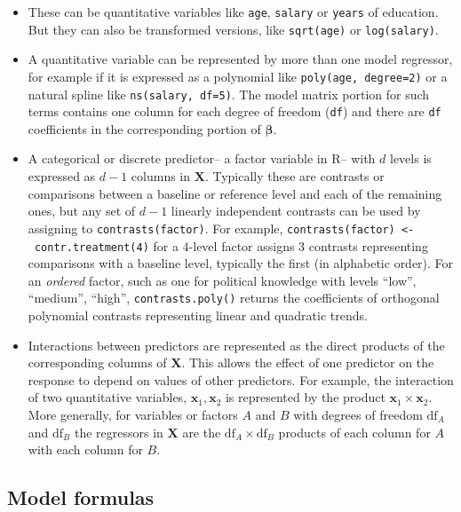 \documentclass[
  letterpaper,
  10pt,
  krantz2]{krantz}
\begin{document}
\begin{itemize}
\item
  These can be quantitative variables like \texttt{age}, \texttt{salary}
  or \texttt{years} of education. But they can also be transformed
  versions, like \texttt{sqrt(age)} or \texttt{log(salary)}.
\item
  A quantitative variable can be represented by more than one model
  regressor, for example if it is expressed as a polynomial like
  \texttt{poly(age,\ degree=2)} or a natural spline like
  \texttt{ns(salary,\ df=5)}. The model matrix portion for such terms
  contains one column for each degree of freedom (\texttt{df}) and there
  are \texttt{df} coefficients in the corresponding portion of
  \(\boldsymbol{\beta}\).
\item
  A categorical or discrete predictor-- a factor variable in R-- with
  \(d\) levels is expressed as \(d - 1\) columns in \(\mathbf{X}\).
  Typically these are contrasts or comparisons between a baseline or
  reference level and each of the remaining ones, but any set of
  \(d - 1\) linearly independent contrasts can be used by assigning to
  \texttt{contrasts(factor)}. For example,
  \texttt{contrasts(factor)\ \textless{}-\ contr.treatment(4)} for a
  4-level factor assigns 3 contrasts representing comparisons with a
  baseline level, typically the first (in alphabetic order). For an
  \emph{ordered} factor, such as one for political knowledge with levels
  ``low'', ``medium'', ``high'', \texttt{contrasts.poly()} returns the
  coefficients of orthogonal polynomial contrasts representing linear
  and quadratic trends.
\item
  Interactions between predictors are represented as the direct products
  of the corresponding columns of \(\mathbf{X}\). This allows the effect
  of one predictor on the response to depend on values of other
  predictors. For example, the interaction of two quantitative
  variables, \(\mathbf{x}_1, \mathbf{x}_2\) is represented by the
  product \(\mathbf{x}_1 \times \mathbf{x}_2\). More generally, for
  variables or factors \(A\) and \(B\) with degrees of freedom
  \(\text{df}_A\) and \(\text{df}_B\) the regressors in \(\mathbf{X}\)
  are the \(\text{df}_A \times \text{df}_B\) products of each column for
  \(A\) with each column for \(B\).
\end{itemize}

\subsection{Model formulas}\label{sec-model-formulas}
\end{document}
